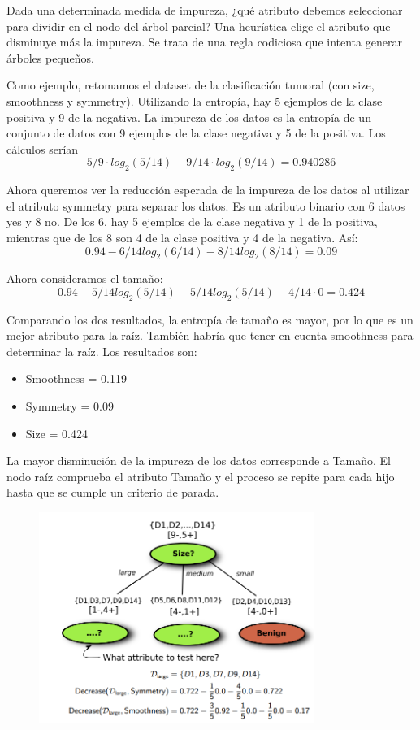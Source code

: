 Dada una determinada medida de impureza, ¿qué atributo debemos seleccionar para dividir en el nodo del árbol parcial? Una heurística elige el atributo que disminuye más la impureza. Se trata de una regla codiciosa que intenta generar árboles pequeños.

Como ejemplo, retomamos el dataset de la clasificación tumoral (con size, smoothness y symmetry). Utilizando la entropía, hay 5 ejemplos de la clase positiva y 9 de la negativa. La impureza de los datos es la entropía de un conjunto de datos con 9 ejemplos de la clase negativa y 5 de la positiva. Los cálculos serían
$$5/9 \cdot  log_2(5/14) - 9/14 \cdot log_2(9/14) = 0.940286$$

Ahora queremos ver la reducción esperada de la impureza de los datos al utilizar el atributo symmetry para separar los datos. Es un atributo binario con 6 datos yes y 8 no. De los 6, hay 5 ejemplos de la clase negativa y 1 de la positiva, mientras que de los 8 son 4 de la clase positiva y 4 de la negativa. Así:
$$0.94 - 6/14 log_2(6/14) - 8/14 log_2(8/14) = 0.09$$

Ahora consideramos el tamaño:
$$0.94 - 5/14 log_2(5/14) - 5/14 log_2(5/14) - 4/14 \cdot 0 = 0.424$$

Comparando los dos resultados, la entropía de tamaño es mayor, por lo que es un mejor atributo para la raíz. También habría que tener en cuenta smoothness para determinar la raíz. Los resultados son:
\begin{itemize}
\item Smoothness = 0.119
\item Symmetry = 0.09
\item Size = 0.424
\end{itemize}

La mayor disminución de la impureza de los datos corresponde a Tamaño. El nodo raíz comprueba el atributo Tamaño y el proceso se repite para cada hijo hasta que se cumple un criterio de parada.

\begin{figure}[h]
\centering
\includegraphics[width = 0.8\textwidth]{figs/tree-result.png}
\end{figure}

